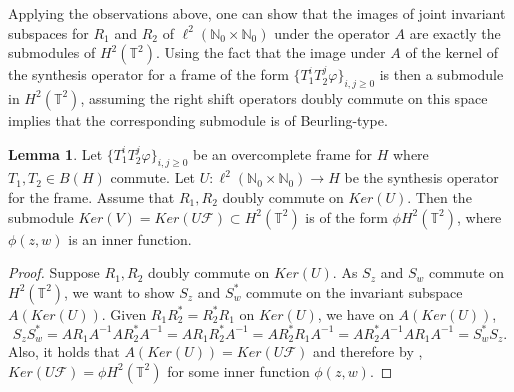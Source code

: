 \documentclass[12pt,reqno]{amsart}
\theoremstyle{definition}
\newtheorem{theorem}{Theorem} [section]
\theoremstyle{definition}
\newtheorem{lemma}[theorem]{Lemma}
\newtheorem{definition}[theorem]{Definition}
\numberwithin{equation}{section}
\begin{document}
 Applying the observations above, one can show that the images of joint invariant subspaces for $R_1$ and $R_2$ of $\ell^{2}(\mathbb{N}_0 \times \mathbb{N}_0)$ under the operator $A$ are exactly the submodules of $H^2(\mathbb{T}^2)$. Using the fact that the image under $A$ of the  kernel of the synthesis operator for a frame  of the form $\{T_{1}^iT_{2}^j\varphi\}_{i,j \geq 0}$ is then a submodule in $H^2(\mathbb{T}^2)$, assuming the right shift operators doubly commute on this space implies that the corresponding submodule is of Beurling-type.
\begin{lemma}\label{beur}
Let $\{T_{1}^iT_{2}^j\varphi\}_{i,j \geq 0}$ be an overcomplete frame for $H$ where $T_1, T_2 \in B(H)$ commute. Let $U: \ell^2(\mathbb{N}_0 \times \mathbb{N}_0) \to H$ be the synthesis operator for the frame. Assume that $R_1, R_2$ doubly commute on $Ker(U)$. Then the submodule $Ker(V) = Ker(U \mathcal{F}) \subset H^2(\mathbb{T}^2)$ is of the form $\phi H^2(\mathbb{T}^2)$, where $\phi(z,w)$ is an inner function. 
\end{lemma}
\begin{proof}
Suppose $R_1, R_2$ doubly commute on $Ker(U)$. As $S_z$ and $S_w$ commute on $H^2(\mathbb{T}^2)$, we want to show $S_z$ and $S_w^{*}$ commute on the invariant subspace $A(Ker(U))$. 
\newline
Given $R_1 R_2^{*} = R_2^{*} R_1$ on $Ker(U)$, we have on $A(Ker(U))$, 
\begin{displaymath}
S_zS_w^{*}= AR_1 A^{-1} A R_2^{*}A^{-1} =AR_1 R_2^{*}A^{-1} = AR_2^{*} R_1A^{-1} = AR_2^{*}A^{-1} A R_1A^{-1} =  S_w^{*} S_z.
\end{displaymath} Also, it holds that $A(Ker(U)) = Ker(U \mathcal{F})$ and therefore by \cite{M88}, $Ker(U \mathcal{F}) = \phi H^2(\mathbb{T}^2)$ for some inner function $\phi(z,w)$.
\end{proof}
\end{document}
